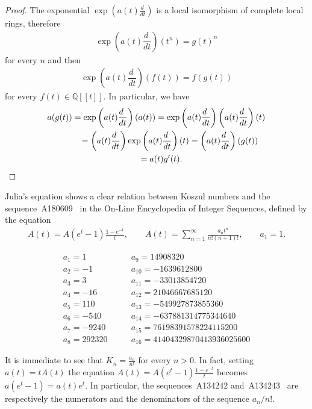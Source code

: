 \documentclass[pdftex]{sigma}
\newcommand{\Q}{\mathbb{Q}}
\numberwithin{equation}{section}
\begin{document}
\begin{proof} The exponential $\exp\left(a(t)\frac{d~}{dt}\right)$ is a local isomorphism of complete local rings, therefore
\begin{gather*} \exp\left(a(t)\dfrac{d~}{dt}\right)(t^n)=g(t)^n\end{gather*}
for every $n$ and then
\begin{gather*} \exp\left(a(t)\dfrac{d~}{dt}\right)(f(t))=f(g(t))\end{gather*}
for every $f(t)\in \Q[[t]]$. In particular, we have
\begin{gather*}
a(g(t)) =\exp\left(a(t)\dfrac{d~}{dt}\right)(a(t))
=\exp\left(a(t)\dfrac{d~}{dt}\right)\left(a(t)\dfrac{d~}{dt}\right)(t)\\
\hphantom{a(g(t))}{} =\left(a(t)\dfrac{d~}{dt}\right)\exp\left(a(t)\dfrac{d~}{dt}\right)(t)
=\left(a(t)\dfrac{d~}{dt}\right)(g(t))\\
\hphantom{a(g(t))}{} =a(t)g'(t) . \tag*{\qed} \end{gather*}
\renewcommand{\qed}{}
\end{proof}

Julia's equation shows a clear relation between Koszul numbers and the sequence~A180609~\cite{hanna} in the On-Line Encyclopedia of Integer Sequences, def\/ined by the equation
\begin{gather*} A(t)=A(e^t-1)\frac{1-e^{-t}}{t},\qquad A(t)=\sum_{n=1}^{\infty} \frac{a_n t^n}{ n! (n+1)! },\qquad
a_1=1 .\end{gather*}

\begin{table}\caption{The f\/irst 16 terms of the sequence OEIS-A180609, $a_n=n! K_n$.}\label{tab.tabellakoszul}
$$\begin{array}{ll}
a_1=1&a_9=14908320\\
a_2=-1&a_{10}=-1639612800\\
a_3=3&a_{11}=-33013854720\\
a_4=-16&a_{12}=21046667685120\\
a_5=110&a_{13}=-549927873855360\\
a_6=-540&a_{14}=-637881314775344640\\
a_7=-9240&a_{15}=76198391578224115200\\
a_8=292320\qquad&a_{16}=41404329870413936025600
\end{array}$$
\end{table}

It is immediate to see that $K_n=\frac{a_n}{n!}$ for every $n>0$. In fact, setting $a(t)=tA(t)$ the equation $A(t)=A(e^t-1)\frac{1-e^{-t}}{t}$ becomes $a(e^t-1)=a(t)e^t$. In particular, the sequences~A134242 and~A134243~\cite{sloane} are respectively the numerators and the denominators of the sequence $a_n/n!$.
\end{document}
